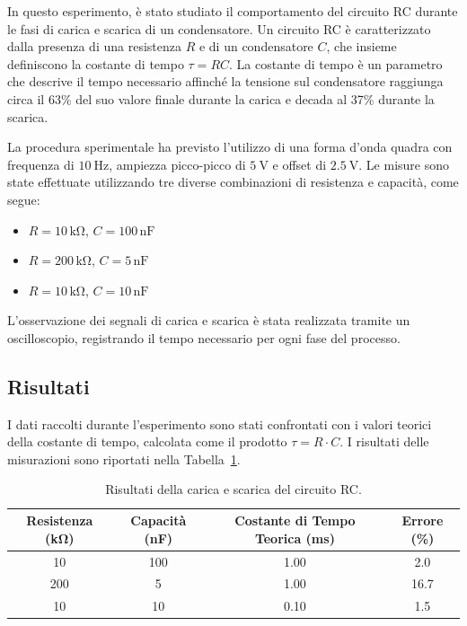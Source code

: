 \documentclass[a4paper,12pt]{article}
\begin{document}
\begin{multicols}{2}

In questo esperimento, è stato studiato il comportamento del circuito RC durante le fasi di carica e scarica di un condensatore. Un circuito RC è caratterizzato dalla presenza di una resistenza \( R \) e di un condensatore \( C \), che insieme definiscono la costante di tempo \(\tau = RC\). La costante di tempo è un parametro che descrive il tempo necessario affinché la tensione sul condensatore raggiunga circa il 63\% del suo valore finale durante la carica e decada al 37\% durante la scarica.

La procedura sperimentale ha previsto l'utilizzo di una forma d'onda quadra con frequenza di \(\SI{10}{\hertz}\), ampiezza picco-picco di \(\SI{5}{\volt}\) e offset di \(\SI{2.5}{\volt}\). Le misure sono state effettuate utilizzando tre diverse combinazioni di resistenza e capacità, come segue:
\begin{itemize}
    \item \( R = 10 \, \mathrm{k\Omega} \), \( C = 100 \, \mathrm{nF} \)
    \item \( R = 200 \, \mathrm{k\Omega} \), \( C = 5 \, \mathrm{nF} \)
    \item \( R = 10 \, \mathrm{k\Omega} \), \( C = 10 \, \mathrm{nF} \)
\end{itemize}
L'osservazione dei segnali di carica e scarica è stata realizzata tramite un oscilloscopio, registrando il tempo necessario per ogni fase del processo.
\end{multicols}

\subsection{Risultati}
I dati raccolti durante l'esperimento sono stati confrontati con i valori teorici della costante di tempo, calcolata come il prodotto \( \tau = R \cdot C \). I risultati delle misurazioni sono riportati nella Tabella~\ref{tab:rc_charge_discharge}.

\begin{table}[H]
\centering
\begin{tabular}{|c|c|c|c|}
\hline
\textbf{Resistenza (\si{\kilo\ohm})} & \textbf{Capacità (\si{\nano\farad})} & \textbf{Costante di Tempo Teorica (\si{\milli\second})} & \textbf{Errore (\%)} \\ \hline
10 & 100 & 1.00 & 2.0 \\ \hline
200 & 5 & 1.00 & 16.7 \\ \hline
10 & 10 & 0.10 & 1.5 \\ \hline
\end{tabular}
\caption{Risultati della carica e scarica del circuito RC.}
\label{tab:rc_charge_discharge}
\end{table}
\end{document}
